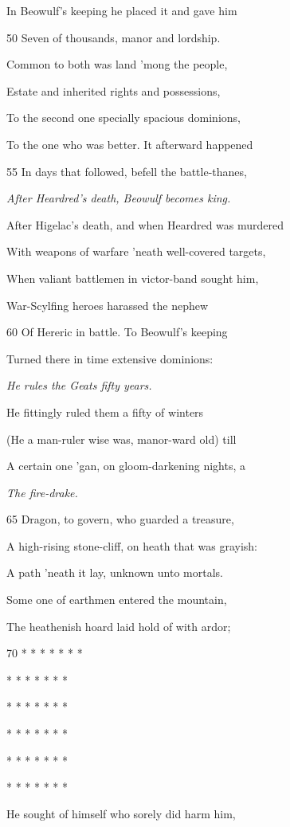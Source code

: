 In Beowulf’s keeping he placed it and gave him

50
Seven of thousands, manor and lordship.

Common to both was land ’mong the people,

Estate and inherited rights and possessions,

To the second one specially spacious dominions,

To the one who was better. It afterward happened

55
In days that followed, befell the battle-thanes,

\emph{After Heardred’s
death, Beowulf becomes
king.}

After Higelac’s death, and when Heardred was murdered

With weapons of warfare ’neath well-covered targets,

When valiant battlemen in victor-band sought him,

War-Scylfing heroes harassed the nephew

60
Of Hereric in battle. To Beowulf’s keeping

Turned there in time extensive dominions:

\emph{He rules the Geats
fifty years.}

He fittingly ruled them a fifty of winters

(He a man-ruler wise was, manor-ward old) till

A certain one ’gan, on gloom-darkening nights, a

\emph{The fire-drake.}

65
Dragon, to govern, who guarded a treasure,

A high-rising stone-cliff, on heath that was grayish:

A path ’neath it lay, unknown unto mortals.

Some one of earthmen entered the mountain,

The heathenish hoard laid hold of with ardor;

70
*
*
*
*
*
* *

*
*
*
*
*
* *

*
*
*
*
*
* *

*
*
*
*
*
* *

*
*
*
*
*
* *



*
*
*
*
*
* *

He sought of himself who sorely did harm him,

